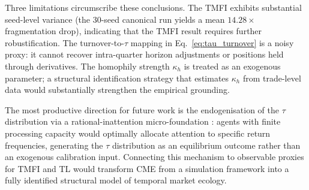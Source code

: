 \documentclass[10pt,twocolumn]{article}
\begin{document}
Three limitations circumscribe these conclusions. The TMFI exhibits
substantial seed-level variance (the 30-seed canonical run yields a mean
$14.28\times$ fragmentation drop), indicating
that the TMFI result requires further robustification. The turnover-to-$\tau$
mapping in Eq.~\eqref{eq:tau_turnover} is a noisy proxy: it cannot recover
intra-quarter horizon adjustments or positions held through derivatives.
The homophily strength $\kappa_h$ is treated as an exogenous parameter;
a structural identification strategy that estimates $\kappa_h$ from
trade-level data would substantially strengthen the empirical grounding.

The most productive direction for future work is the endogenisation of the
$\tau$ distribution via a rational-inattention micro-foundation
\cite{sims2003}: agents with finite processing capacity would optimally
allocate attention to specific return frequencies, generating the $\tau$
distribution as an equilibrium outcome rather than an exogenous calibration
input. Connecting this mechanism to observable proxies for TMFI and TL
would transform CME from a simulation framework into a fully identified
structural model of temporal market ecology.
\end{document}
